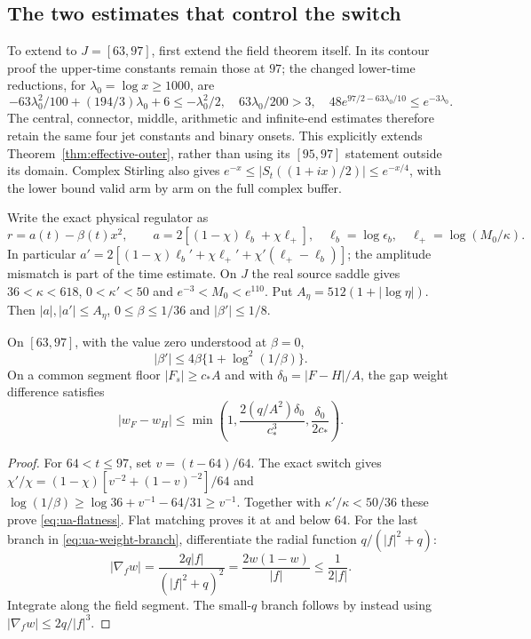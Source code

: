 \subsection{The two estimates that control the switch}
To extend to $J=[63,97]$, first extend the field theorem itself. In its
contour proof the upper-time constants remain those at $97$; the changed
lower-time reductions, for $\lambda_0=\log x\ge1000$, are
\[
 -63\lambda_0^2/100+(194/3)\lambda_0+6\le-\lambda_0^2/2,
 \quad63\lambda_0/200>3,
 \quad48e^{97/2-63\lambda_0/10}\le e^{-3\lambda_0}.
\]
The central, connector, middle, arithmetic and infinite-end estimates
therefore retain the same four jet constants and binary onsets.
This explicitly extends Theorem~\ref{thm:effective-outer}, rather than
using its $[95,97]$ statement outside its domain. Complex Stirling also
gives $e^{-x}\le|S_t((1+ix)/2)|\le e^{-x/4}$, with the lower bound
valid arm by arm on the full complex buffer.

Write the exact physical regulator as
\begin{equation}
 r=a(t)-\beta(t)x^2,\qquad
 a=2[(1-\chi)\ell_b+\chi\ell_+],\quad
 \ell_b=\log\epsilon_b,\quad \ell_+=\log(M_0/\kappa).
 \label{eq:ua-switch-r}
\end{equation}
In particular
$a'=2[(1-\chi)\ell_b'+\chi\ell_+'+\chi'(\ell_+-\ell_b)]$;
the amplitude mismatch is part of the time estimate. On $J$ the real
source saddle gives $36<\kappa<618$, $0<\kappa'<50$ and
$e^{-3}<M_0<e^{110}$. Put $A_\eta=512(1+|\log\eta|)$.
Then $|a|,|a'|\le A_\eta$, $0\le\beta\le1/36$ and
$|\beta'|\le1/8$.

\begin{lemma}
\label{lem:ua-switch}
On $[63,97]$, with the value zero understood at $\beta=0$,
\begin{equation}
 |\beta'|\le4\beta\{1+\log^2(1/\beta)\}.
 \label{eq:ua-flatness}
\end{equation}
On a common segment floor $|F_s|\ge c_*A$ and with
$\delta_0=|F-H|/A$, the gap weight difference satisfies
\begin{equation}
 |w_F-w_H|\le
 \min\left(1,\frac{2(q/A^2)\delta_0}{c_*^3},
                    \frac{\delta_0}{2c_*}\right).
 \label{eq:ua-weight-branch}
\end{equation}
\end{lemma}
\begin{proof}
For $64<t\le97$, set $v=(t-64)/64$. The exact switch gives
$\chi'/\chi=(1-\chi)[v^{-2}+(1-v)^{-2}]/64$ and
$\log(1/\beta)\ge\log36+v^{-1}-64/31\ge v^{-1}$.
Together with $\kappa'/\kappa<50/36$ these prove
\eqref{eq:ua-flatness}. Flat matching proves it at and below $64$.
For the last branch in \eqref{eq:ua-weight-branch}, differentiate the
radial function $q/(|f|^2+q)$:
\[
 |\nabla_f w|=\frac{2q|f|}{(|f|^2+q)^2}
       =\frac{2w(1-w)}{|f|}\le\frac1{2|f|}.
\]
Integrate along the field segment. The small-$q$ branch follows by
instead using $|\nabla_fw|\le2q/|f|^3$.
\end{proof}

